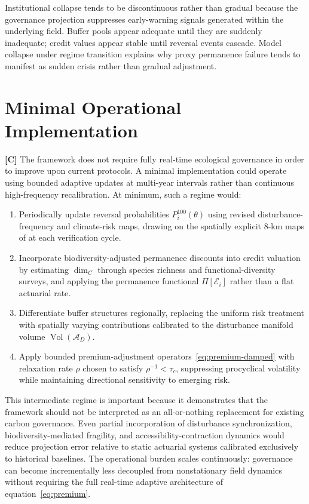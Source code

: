 \documentclass[12pt]{article}
\newcommand{\vol}{\operatorname{Vol}}
\begin{document}
Institutional collapse tends to be discontinuous rather than gradual because the
governance projection suppresses early-warning signals generated within the underlying
field. Buffer pools appear adequate until they are suddenly inadequate; credit values
appear stable until reversal events cascade. Model collapse under regime transition
explains why proxy permanence failure tends to manifest as sudden crisis rather than
gradual adjustment.

\section{Minimal Operational Implementation}

\textbf{[C]} The framework does not require fully real-time ecological governance in
order to improve upon current protocols. A minimal implementation could operate using
bounded adaptive updates at multi-year intervals rather than continuous high-frequency
recalibration. At minimum, such a regime would:

\begin{enumerate}[leftmargin=*]
\item Periodically update reversal probabilities $P_i^{100}(\theta)$ using revised
disturbance-frequency and climate-risk maps, drawing on the spatially explicit 8-km
maps of \citet{Wu2026} at each verification cycle.

\item Incorporate biodiversity-adjusted permanence discounts into credit valuation by
estimating $\dim_C$ through species richness and functional-diversity surveys, and
applying the permanence functional $\Pi[\mathcal{E}_i]$ rather than a flat actuarial
rate.

\item Differentiate buffer structures regionally, replacing the uniform risk treatment
with spatially varying contributions calibrated to the disturbance manifold volume
$\vol(\mathcal{A}_D)$.

\item Apply bounded premium-adjustment operators~\eqref{eq:premium-damped} with
relaxation rate $\rho$ chosen to satisfy $\rho^{-1} < \tau_c$, suppressing procyclical
volatility while maintaining directional sensitivity to emerging risk.
\end{enumerate}

This intermediate regime is important because it demonstrates that the framework should
not be interpreted as an all-or-nothing replacement for existing carbon governance. Even
partial incorporation of disturbance synchronization, biodiversity-mediated fragility, and
accessibility-contraction dynamics would reduce projection error relative to static
actuarial systems calibrated exclusively to historical baselines. The operational burden
scales continuously: governance can become incrementally less decoupled from nonstationary
field dynamics without requiring the full real-time adaptive architecture of
equation~\eqref{eq:premium}.
\end{document}
